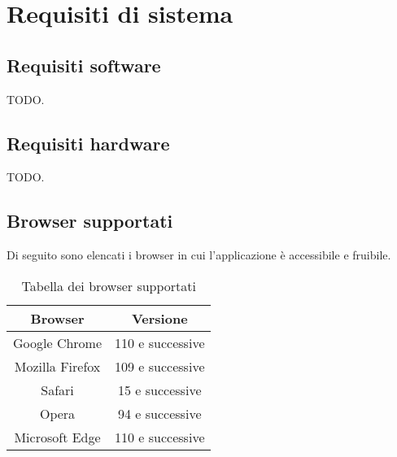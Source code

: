 \section{Requisiti di sistema}

\subsection{Requisiti software}
\par TODO.

\subsection{Requisiti hardware}
\par TODO.

\subsection{Browser supportati}
\par Di seguito sono elencati i browser in cui l'applicazione è accessibile e fruibile.

\begin{table}[H]
  \centering
  \begin{tabular}{|c|c|}
      \hline
      \textbf{Browser} & \textbf{Versione} \\
      \hline
      Google Chrome & 110 e successive \\
      \hline
      Mozilla Firefox & 109 e successive \\
      \hline
      Safari & 15 e successive \\
      \hline
      Opera & 94 e successive \\
      \hline
      Microsoft Edge & 110 e successive \\
      \hline
  \end{tabular}
  \caption{Tabella dei browser supportati}
\end{table}